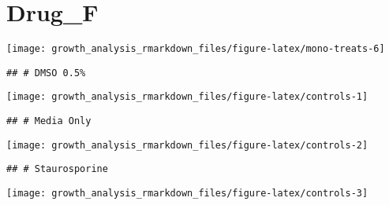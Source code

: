 \documentclass[
  11pt,
]{article}
\begin{document}
\section{Drug\_F}\label{drug_f}

\begin{center}\texttt{[image: growth\_analysis\_rmarkdown\_files/figure-latex/mono-treats-6]} \end{center}

\begin{verbatim}
## # DMSO 0.5%
\end{verbatim}

\begin{center}\texttt{[image: growth\_analysis\_rmarkdown\_files/figure-latex/controls-1]} \end{center}

\begin{verbatim}
## # Media Only
\end{verbatim}

\begin{center}\texttt{[image: growth\_analysis\_rmarkdown\_files/figure-latex/controls-2]} \end{center}

\begin{verbatim}
## # Staurosporine
\end{verbatim}

\begin{center}\texttt{[image: growth\_analysis\_rmarkdown\_files/figure-latex/controls-3]} \end{center}
\end{document}
